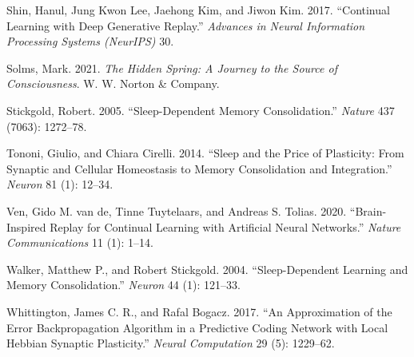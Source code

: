 \documentclass[
]{article}
\newlength{\cslhangindent}
\newenvironment{CSLReferences}[2] %
 {\begin{list}{}{%
  \setlength{\itemindent}{0pt}
  \setlength{\leftmargin}{0pt}
  \setlength{\parsep}{0pt}
  \ifodd #1
   \setlength{\leftmargin}{\cslhangindent}
   \setlength{\itemindent}{-1\cslhangindent}
  \fi
  \setlength{\itemsep}{#2\baselineskip}}}
 {\end{list}}
\begin{document}
\begin{CSLReferences}{1}{1}
Shin, Hanul, Jung Kwon Lee, Jaehong Kim, and Jiwon Kim. 2017.
{``Continual Learning with Deep Generative Replay.''} \emph{Advances in
Neural Information Processing Systems ({NeurIPS})} 30.

Solms, Mark. 2021. \emph{The Hidden Spring: A Journey to the Source of
Consciousness}. W. W. Norton \& Company.

Stickgold, Robert. 2005. {``Sleep-Dependent Memory Consolidation.''}
\emph{Nature} 437 (7063): 1272--78.

Tononi, Giulio, and Chiara Cirelli. 2014. {``Sleep and the Price of
Plasticity: From Synaptic and Cellular Homeostasis to Memory
Consolidation and Integration.''} \emph{Neuron} 81 (1): 12--34.

Ven, Gido M. van de, Tinne Tuytelaars, and Andreas S. Tolias. 2020.
{``Brain-Inspired Replay for Continual Learning with Artificial Neural
Networks.''} \emph{Nature Communications} 11 (1): 1--14.

Walker, Matthew P., and Robert Stickgold. 2004. {``Sleep-Dependent
Learning and Memory Consolidation.''} \emph{Neuron} 44 (1): 121--33.

Whittington, James C. R., and Rafal Bogacz. 2017. {``An Approximation of
the Error Backpropagation Algorithm in a Predictive Coding Network with
Local {Hebbian} Synaptic Plasticity.''} \emph{Neural Computation} 29
(5): 1229--62.

\end{CSLReferences}
\end{document}
